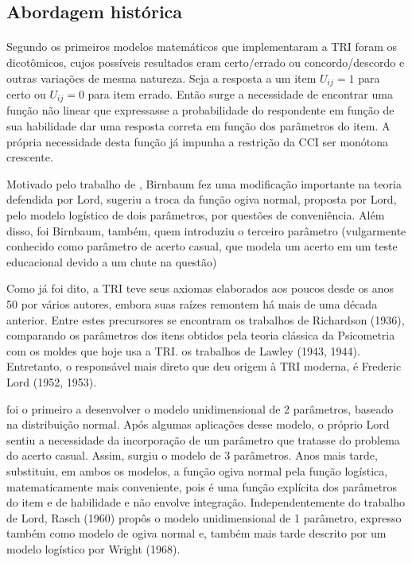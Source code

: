 	\newpage
	\subsection{Abordagem histórica}
	\paragraph{}
	    Segundo \textcite{Dalton} os primeiros modelos matemáticos que implementaram a TRI foram os dicotômicos, cujos possíveis resultados eram certo/errado ou concordo/descordo e outras variações de mesma natureza. Seja a resposta a um item $U_{ij} = 1$ para certo ou $U_{ij} = 0$ para item errado. Então surge a necessidade de encontrar uma função não linear que expressasse a probabilidade do respondente em função de sua habilidade dar uma resposta correta em função dos parâmetros do item. A própria necessidade desta função já impunha a restrição da CCI ser monótona crescente. %
    \par	 
        Motivado pelo trabalho de \textcite{Lord}, Birnbaum fez uma modificação importante na teoria defendida por Lord, sugeriu a troca da função ogiva normal, proposta por Lord, pelo modelo logístico de dois parâmetros, por questões de conveniência. Além disso, foi Birnbaum, também, quem introduziu o terceiro parâmetro (vulgarmente conhecido como parâmetro de acerto casual, que modela um acerto em um teste educacional devido a um chute na questão)
	\par
		Como já foi dito, a TRI teve seus axiomas elaborados aos poucos desde os anos 50 por vários autores, embora suas raízes remontem há mais de uma década anterior. Entre estes precursores se encontram os trabalhos de Richardson (1936), comparando os parâmetros dos itens obtidos pela teoria clássica da Psicometria com os moldes que hoje usa a TRI. os trabalhos de Lawley (1943, 1944).
		Entretanto, o responsável mais direto que deu origem à TRI moderna, é Frederic Lord (1952, 1953).
	\par
        \textcite{Lord} foi o primeiro a desenvolver o modelo unidimensional de 2 parâmetros, baseado na distribuição normal. Após algumas aplicações desse modelo, o próprio Lord sentiu a necessidade da incorporação de um parâmetro que tratasse do problema do acerto casual. Assim, surgiu o modelo de 3 parâmetros. Anos mais tarde, \textcite{Birnbaum} substituiu, em ambos os modelos, a função ogiva normal pela função logística, matematicamente mais conveniente, pois é uma função explícita dos parâmetros do item e de habilidade e não envolve integração. Independentemente do trabalho de Lord, Rasch (1960) propôs o modelo unidimensional de 1 parâmetro, expresso também como modelo de ogiva normal e, também mais tarde descrito por um modelo logístico por Wright (1968).
        \cite{Hamblenton}
